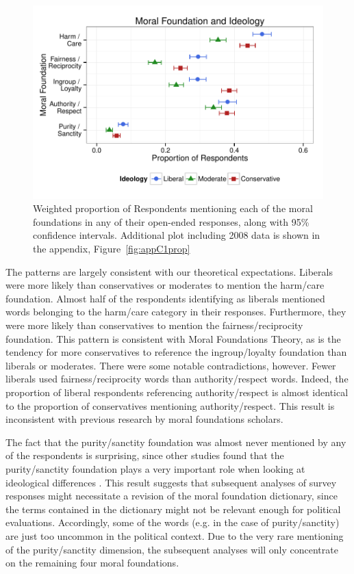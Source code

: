 \documentclass[12pt]{article}
\begin{document}
\begin{figure}[h]\centering
\includegraphics[scale=.9]{../calc/fig/fig1prop.pdf}
\caption{Weighted proportion of Respondents mentioning each of the moral foundations in any of their open-ended responses, along with 95\% confidence intervals. Additional plot including 2008 data is shown in the appendix, Figure~\ref{fig:appC1prop}}\label{fig:1prop}
\end{figure}

The patterns are largely consistent with our theoretical expectations. Liberals were more likely than conservatives or moderates to mention the harm/care foundation. Almost half of the respondents identifying as liberals mentioned words belonging to the harm/care category in their responses. Furthermore, they were more likely than conservatives to mention the fairness/reciprocity foundation. This pattern is consistent with Moral Foundations Theory, as is the tendency for more conservatives to reference the ingroup/loyalty foundation than liberals or moderates. There were some notable contradictions, however. Fewer liberals used fairness/reciprocity words than authority/respect words. Indeed, the proportion of liberal respondents referencing authority/respect is almost identical to the proportion of conservatives mentioning authority/respect. This result is inconsistent with previous research by moral foundations scholars.

The fact that the purity/sanctity foundation was almost never mentioned by any of the respondents is surprising, since other studies found that the purity/sanctity foundation plays a very important role when looking at ideological differences \citep{koleva2012tracing}. This result suggests that subsequent analyses of survey responses might necessitate a revision of the moral foundation dictionary, since the terms contained in the dictionary might not be relevant enough for political evaluations. Accordingly, some of the words (e.g. in the case of purity/sanctity) are just too uncommon in the political context. Due to the very rare mentioning of the purity/sanctity dimension, the subsequent analyses will only concentrate on the remaining four moral foundations.
\end{document}
